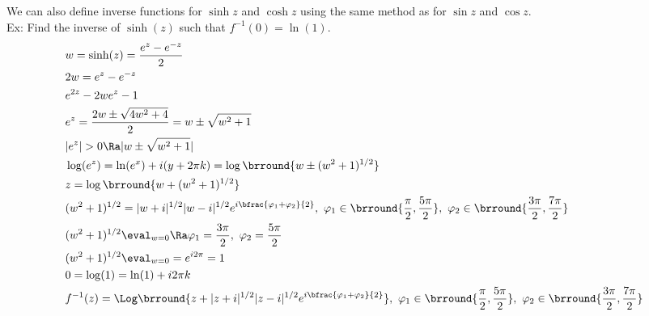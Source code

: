 We can also define inverse functions for $\sinh z$ and $\cosh z$ using the same method as for $\sin z$ and $\cos z$.\\
Ex: Find the inverse of $\sinh(z)$ such that $f^{-1}(0)=\ln(1)$.
\begin{align*}
    &w=\sinh(z)=\frac{e^z-e^{-z}}{2}\\
    &2w=e^z-e^{-z}\\
    &e^{2z}-2we^z-1\\
    &e^z=\frac{2w\pm\sqrt{4w^2+4}}{2}=w\pm\sqrt{w^2+1}\\
    &|e^z|>0\Ra |w\pm\sqrt{w^2+1}|\\
    &\log(e^z)=\ln(e^x)+i(y+2\pi k)=\log\brround{w\pm(w^2+1)^{1/2}}\\
    &z=\log\brround{w+(w^2+1)^{1/2}}\\
    &(w^2+1)^{1/2}=|w+i|^{1/2}|w-i|^{1/2}e^{i\bfrac{\varphi_1+\varphi_2}{2}},\ \varphi_1\in\brround{\frac{\pi}{2},\frac{5\pi}{2}},\ \varphi_2\in\brround{\frac{3\pi}{2},\frac{7\pi}{2}}\\
    &(w^2+1)^{1/2}\eval_{w=0}\Ra \varphi_1=\frac{3\pi}{2},\ \varphi_2=\frac{5\pi}{2}\\
    &(w^2+1)^{1/2}\eval_{w=0}=e^{i2\pi}=1\\
    &0=\log(1)=\ln(1)+i2\pi k\\
    &f^{-1}(z)=\Log\brround{z+|z+i|^{1/2}|z-i|^{1/2}e^{i\bfrac{\varphi_1+\varphi_2}{2}}},\ \varphi_1\in\brround{\frac{\pi}{2},\frac{5\pi}{2}},\ \varphi_2\in\brround{\frac{3\pi}{2},\frac{7\pi}{2}}
\end{align*}